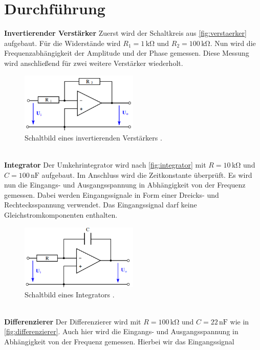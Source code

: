 \section{Durchführung}
\label{sec:Durchführung}

\textbf{Invertierender Verstärker}
Zuerst wird der Schaltkreis aus \autoref{fig:verstaerker} aufgebaut. Für die Widerstände wird
$R_1 = 1 \,\unit{\kilo\ohm}$ und $R_2 = 100 \,\unit{\kilo\ohm}$. Nun wird die Frequenzabhängigkeit der
Amplitude und der Phase gemessen. Diese Messung wird anschließend für zwei weitere Verstärker wiederholt.
\begin{figure}
    \centering
    \includegraphics[width=0.5\textwidth]{invertierend.png}
    \caption{Schaltbild eines invertierenden Verstärkers \cite{ap51}.}
    \label{fig:verstaerker}
\end{figure}
\\
\textbf{Integrator}
Der Umkehrintegrator wird nach \autoref{fig:integrator} mit $R = 10\,\unit{\kilo\ohm}$ und 
$C = 100\,\text{nF}$ aufgebaut. Im Anschluss wird die Zeitkonstante überprüft. 
Es wird nun die Eingangs- und Ausgangsspannung in Abhängigkeit von der Frequenz gemessen. 
Dabei werden Eingangssignale in Form einer Dreicks- und Rechtecksspannung verwendet. Das Eingangssignal 
darf keine Gleichstromkomponenten enthalten.
\begin{figure}
    \centering
    \includegraphics[width=0.5\textwidth]{integrator.png}
    \caption{Schaltbild eines Integrators \cite{ap51}.}
    \label{fig:integrator}
\end{figure}
\\
\textbf{Differenzierer}
Der Differenzierer wird mit $R=100\,\unit{\kilo\ohm}$ und $C=22\,\text{nF}$ wie in \autoref{fig:differenzierer}.
Auch hier wird die Eingangs- und Ausgangsspannung in Abhängigkeit von der Frequenz gemessen. Hierbei wir das Eingangssignal 
